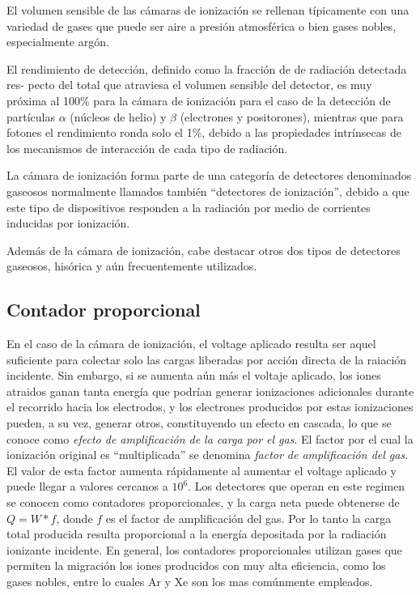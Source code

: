 El volumen sensible de las c\'amaras de ionizaci\'on se rellenan t\'ipicamente con una variedad de gases que puede ser aire a 
presi\'on atmosf\'erica o bien
gases nobles, especialmente arg\'on.

El rendimiento de detecci\'on, definido como la fracci\'on de de radiaci\'on detectada res-\-
pecto del total que atraviesa el volumen sensible del detector, es
muy pr\'oxima al 100\% para la c\'amara de ionizaci\'on para el caso de la detecci\'on de part\'iculas $\alpha$ (n\'ucleos de helio) y $\beta$ (electrones
y positorones), mientras que para fotones el rendimiento ronda solo el 1\%, debido a las propiedades intr\'insecas de los mecanismos de interacci\'on de
cada tipo de radiaci\'on.

La c\'amara de ionizaci\'on forma parte de una categor\'ia de detectores denominados gaseosos normalmente llamados tambi\'en ``detectores de ionizaci\'on'', 
debido a que este tipo de dispositivos responden a la radiaci\'on por medio de corrientes inducidas por ionizaci\'on.

Adem\'as de la c\'amara de ionizaci\'on, cabe destacar otros dos tipos de detectores gaseosos, his\'orica y a\'un frecuentemente utilizados.

\subsection{Contador proporcional}
\label{CapIII_7}

En el caso de la c\'amara de ionizaci\'on, el voltage aplicado resulta ser aquel suficiente para colectar solo las cargas liberadas por acci\'on directa de 
la raiaci\'on incidente. Sin embargo, si se aumenta a\'un m\'as el voltaje aplicado, los iones atraidos ganan tanta energ\'ia que podr\'ian generar ionizaciones 
adicionales durante el recorrido hacia los electrodos, y los electrones producidos por estas ionizaciones pueden, a su vez, generar otros, constituyendo un 
efecto en cascada, lo que se conoce como \textit{efecto de amplificaci\'on de la carga por el gas}. El factor por el cual la ionizaci\'on original es 
``multiplicada'' se denomina \textit{factor de amplificaci\'on del gas}. El valor de esta factor aumenta r\'apidamente al aumentar el voltage aplicado y puede 
llegar a valores cercanos a $10^{6}$. Los detectores que operan en este regimen se conocen como contadores proporcionales, y la carga neta puede obtenerse de 
$Q=W*f$, donde $f$ es el factor de amplificaci\'on del gas. Por lo tanto la carga total producida resulta proporcional a la energ\'ia depositada por la 
radiaci\'on ionizante incidente. En general, los contadores proporcionales utilizan gases que permiten la migraci\'on los iones producidos con muy alta 
eficiencia, como los gases nobles, entre lo cuales Ar y Xe son los mas com\'unmente empleados.

